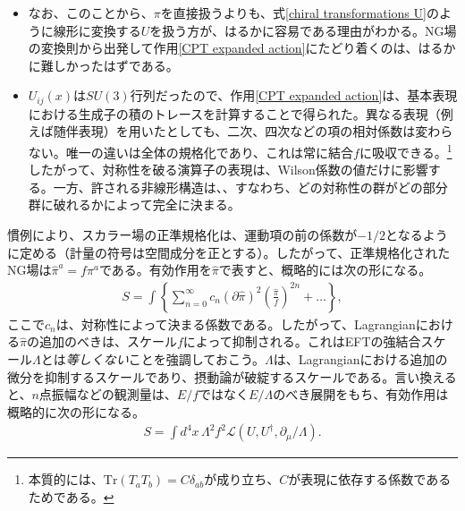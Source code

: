 \begin{itemize}
	\item なお、このことから、$\pi$を直接扱うよりも、式\eqref{chiral transformations U}のように線形に変換する$U$を扱う方が、はるかに容易である理由がわかる。NG場の変換則から出発して作用\eqref{CPT expanded action}にたどり着くのは、はるかに難しかったはずである。
	\item $U_{ij}(x)$は$SU(3)$行列だったので、作用\eqref{CPT expanded action}は、基本表現における生成子の積のトレースを計算することで得られた。異なる表現（例えば随伴表現）を用いたとしても、二次、四次などの項の相対係数は変わらない。唯一の違いは全体の規格化であり、これは常に結合$f$に吸収できる。\footnote{本質的には、$\mbox{Tr} (T_a T_b) = C \delta_{ab}$が成り立ち、$C$が表現に依存する係数であるためである。}したがって、対称性を破る演算子の表現は、Wilson係数の値だけに影響する。一方、許される非線形構造は、、すなわち、どの対称性の群がどの部分群に破れるかによって完全に決まる。
\end{itemize}
%

慣例により、スカラー場の正準規格化は、運動項の前の係数が$-1/2$となるように定める（計量の符号は空間成分を正とする）。したがって、正準規格化されたNG場は$\hat \pi^a = f \pi^a$である。有効作用を$\hat \pi$で表すと、概略的には次の形になる。
%
\begin{align}
	S = \int \left\{ \sum_{n=0}^\infty c_n (\partial \hat \pi)^2 \! \left( \frac{\hat \pi}{f} \right)^{2n} + \dots \right\} , 
\end{align}
%
ここで$c_n$は、対称性によって決まる係数である。したがって、Lagrangianにおける$\hat \pi$の追加のべきは、スケール$f$によって抑制される。これはEFTの強結合スケール$\Lambda$とは\emph{等しくない}ことを強調しておこう。$\Lambda$は、Lagrangianにおける追加の微分を抑制するスケールであり、摂動論が破綻するスケールである。言い換えると、$n$点振幅などの観測量は、$E/f$ではなく$E /\Lambda$のべき展開をもち、有効作用は概略的に次の形になる。
%
\begin{align}\label{full action CPT}
	S = \int d^4 x \, \Lambda^2 f^2 \mathcal{L} (U, U^\dag,\partial_\mu / \Lambda).
\end{align}
%

